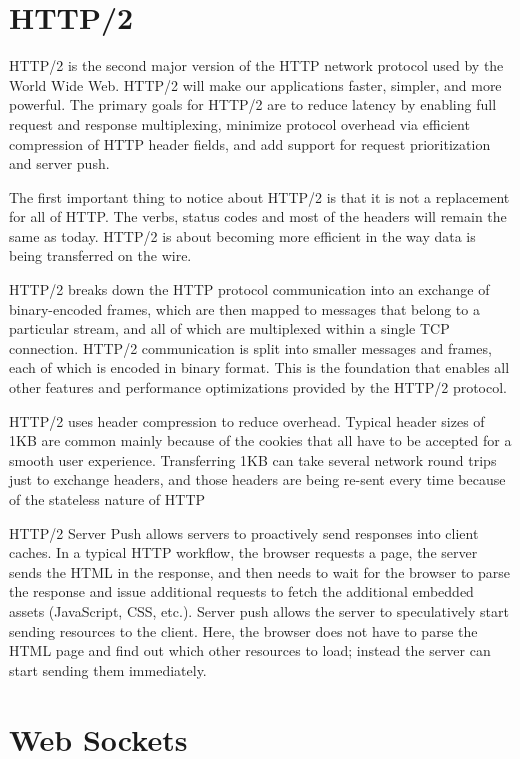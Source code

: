 \section{HTTP/2}
\label{section:http2}
HTTP/2 is the second major version of the HTTP network protocol used by the World Wide Web. HTTP/2 will make our applications faster, simpler, and more powerful. The primary goals for HTTP/2 are to reduce latency by enabling full request and response multiplexing, minimize protocol overhead via efficient compression of HTTP header fields, and add support for request prioritization and server push\citep{thesis:state10}.

The first important thing to notice about HTTP/2 is that it is not a replacement for all of HTTP. The verbs, status codes and most of the headers will remain the same as today. HTTP/2 is about becoming more efficient in the way data is being transferred on the wire\citep{thesis:state11}.

HTTP/2 breaks down the HTTP protocol communication into an exchange of binary-encoded frames, which are then mapped to messages that belong to a particular stream, and all of which are multiplexed within a single TCP connection. HTTP/2 communication is split into smaller messages and frames, each of which is encoded in binary format. This is the foundation that enables all other features and performance optimizations provided by the HTTP/2 protocol.

HTTP/2 uses header compression to reduce overhead. Typical header sizes of 1KB are common mainly because of the cookies that all have to be accepted for a smooth user experience. Transferring 1KB can take several network round trips just to exchange headers, and those headers are being re-sent every time because of the stateless nature of HTTP

HTTP/2 Server Push allows servers to proactively send responses into client caches. In a typical HTTP workflow, the browser requests a page, the server sends the HTML in the response, and then needs to wait for the browser to parse the response and issue additional requests to fetch the additional embedded assets (JavaScript, CSS, etc.). Server push allows the server to speculatively start sending resources to the client. Here, the browser does not have to parse the HTML page and find out which other resources to load; instead the server can start sending them immediately.
\section{Web Sockets}
\label{section:websockets}

